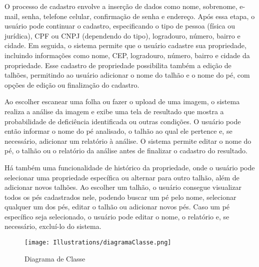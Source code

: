 O processo de cadastro envolve a inserção de dados como nome, sobrenome, e-mail, senha, telefone celular, confirmação de senha e endereço. Após essa etapa, o usuário pode continuar o cadastro, especificando o tipo de pessoa (física ou jurídica), CPF ou CNPJ (dependendo do tipo), logradouro, número, bairro e cidade. Em seguida, o sistema permite que o usuário cadastre sua propriedade, incluindo informações como nome, CEP, logradouro, número, bairro e cidade da propriedade. Esse cadastro de propriedade possibilita também a edição de talhões, permitindo ao usuário adicionar o nome do talhão e o nome do pé, com opções de edição ou finalização do cadastro.

Ao escolher escanear uma folha ou fazer o upload de uma imagem, o sistema realiza a análise da imagem e exibe uma tela de resultado que mostra a probabilidade de deficiência identificada ou outras condições. O usuário pode então informar o nome do pé analisado, o talhão ao qual ele pertence e, se necessário, adicionar um relatório à análise. O sistema permite editar o nome do pé, o talhão ou o relatório da análise antes de finalizar o cadastro do resultado.

Há também uma funcionalidade de histórico da propriedade, onde o usuário pode selecionar uma propriedade específica ou alternar para outro talhão, além de adicionar novos talhões. Ao escolher um talhão, o usuário consegue visualizar todos os pés cadastrados nele, podendo buscar um pé pelo nome, selecionar qualquer um dos pés, editar o talhão ou adicionar novos pés. Caso um pé específico seja selecionado, o usuário pode editar o nome, o relatório e, se necessário, excluí-lo do sistema.

\begin{figure}[H]
\centering
\caption{Diagrama de Classe}
\texttt{[image: Illustrations/diagramaClasse.png]}
\label{fig:diagrama-classe}
\end{figure}


